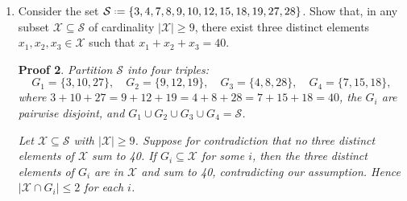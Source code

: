 \documentclass[12pt]{article}
\newcommand{\defeq}{\mathrel{\vcenter{\baselineskip0.5ex \lineskiplimit0pt
                     \hbox{\scriptsize.}\hbox{\scriptsize.}}}=}
\theoremstyle{proofstyle}
\newtheorem*{proof*}{Proof}
\begin{document}
\begin{enumerate}[left=0pt, itemsep=2em, parsep=1em]
\begin{proof*}
Let $A \defeq \mathbb{N} \setminus \{k \in \mathbb{N} \mid k < 257\}$ and
$B \defeq \{k \in \mathbb{N} \mid k < 512\}$, so $|B| = 512$.

Define $f : A \to B$ by $(\forall x \in A)(f(x) \defeq 7^x \mathbin{\%} 512)$.

By the Corollary, $|A| = |\mathbb{N}|$. By the Theorem, an infinite set is larger than any
finite set, so
\[
|A| = |\mathbb{N}| > |B| = 512.
\]

By the Pigeonhole Theorem,
\[
    |A| > |B| \Rightarrow (\forall f : A \to B)(\exists x, y \in A)(x \neq y \land f(x) = f(y)),
\]
so $(\exists c, d \in A)(c \neq d \land f(c) = f(d))$, i.e., $7^c \mathbin{\%} 512 = 7^d \mathbin{\%} 512$.

By the Euclidean Division Lemma, $7^c = 512 q_1 + r_1$ and $7^d = 512 q_2 + r_2$ with
$0 \leq r_1, r_2 < 512$. Since $f(c) = f(d)$, we have $r_1 = r_2$, so subtracting gives
$7^c - 7^d = 512(q_1 - q_2)$. Since $q_1 - q_2 \in \mathbb{Z}$, we have
$512 \mid (7^c - 7^d)$, i.e., $7^c \equiv 7^d \pmod{512}$.

Let $a \defeq \min(c, d)$ and $b \defeq \max(c, d)$. Since $c \neq d$ we have $a < b$,
and since $c, d \in A$ we have $a, b > 256$.

Therefore there exist $a, b \in \mathbb{N}$ such that $256 < a < b$ and $7^a \equiv 7^b \pmod{512}$. \qed
\end{proof*}

\newpage

\item Consider the set $\mathcal{S} \defeq \{3, 4, 7, 8, 9, 10, 12, 15, 18, 19, 27, 28\}$. Show that, in any subset
$\mathcal{X} \subseteq \mathcal{S}$ of cardinality $|\mathcal{X}| \geq 9$, there exist three distinct elements
$x_1, x_2, x_3 \in \mathcal{X}$ such that $x_1 + x_2 + x_3 = 40$.

\begin{proof*}
Partition $\mathcal{S}$ into four triples:
\[
  G_1 = \{3, 10, 27\}, \quad G_2 = \{9, 12, 19\}, \quad G_3 = \{4, 8, 28\}, \quad G_4 = \{7, 15, 18\},
\]
where $3+10+27 = 9+12+19 = 4+8+28 = 7+15+18 = 40$, the $G_i$ are pairwise disjoint,
and $G_1 \cup G_2 \cup G_3 \cup G_4 = \mathcal{S}$.

Let $\mathcal{X} \subseteq \mathcal{S}$ with $|\mathcal{X}| \geq 9$. Suppose for contradiction
that no three distinct elements of $\mathcal{X}$ sum to 40. If $G_i \subseteq \mathcal{X}$
for some $i$, then the three distinct elements of $G_i$ are in $\mathcal{X}$ and sum to 40,
contradicting our assumption. Hence $|\mathcal{X} \cap G_i| \leq 2$ for each $i$.


\end{proof*}
\end{enumerate}
\end{document}

